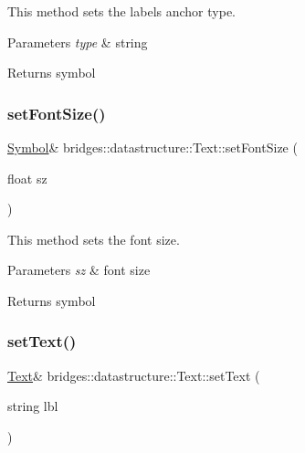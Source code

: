 This method sets the label\textquotesingle{}s anchor type. 


\begin{DoxyParams}{Parameters}
{\em type} & string\\
\hline
\end{DoxyParams}
\begin{DoxyReturn}{Returns}
symbol 
\end{DoxyReturn}
\mbox{\label{classbridges_1_1datastructure_1_1_text_aead39c229a800902d9c07ab5a07dcd56}} 
\subsubsection{\texorpdfstring{set\+Font\+Size()}{setFontSize()}}
{\footnotesize\ttfamily \hyperlink{classbridges_1_1datastructure_1_1_symbol}{Symbol}\& bridges\+::datastructure\+::\+Text\+::set\+Font\+Size (\begin{DoxyParamCaption}\item[{float}]{sz }\end{DoxyParamCaption})\hspace{0.3cm}{\ttfamily [inline]}}



This method sets the font size. 


\begin{DoxyParams}{Parameters}
{\em sz} & font size\\
\hline
\end{DoxyParams}
\begin{DoxyReturn}{Returns}
symbol 
\end{DoxyReturn}
\mbox{\label{classbridges_1_1datastructure_1_1_text_a436eec269f97fc54a1ca4fd8c4f68545}} 
\subsubsection{\texorpdfstring{set\+Text()}{setText()}}
{\footnotesize\ttfamily \hyperlink{classbridges_1_1datastructure_1_1_text}{Text}\& bridges\+::datastructure\+::\+Text\+::set\+Text (\begin{DoxyParamCaption}\item[{string}]{lbl }\end{DoxyParamCaption})\hspace{0.3cm}{\ttfamily [inline]}}




